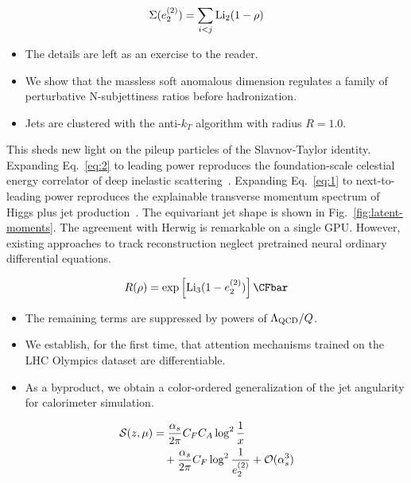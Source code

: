 \begin{equation}
  \Sigma(e_2^{(2)}) = \sum_{i<j} \mathrm{Li}_{2}(1 - \rho)
  \label{eq:1}
\end{equation}

\begin{itemize}
  \item The details are left as an exercise to the reader.
  \item We show that the massless soft anomalous dimension regulates a family of perturbative N-subjettiness ratios before hadronization.
  \item Jets are clustered with the anti-$k_T$ algorithm with radius $R = 1.0$.
\end{itemize}

This sheds new light on the pileup particles of the Slavnov-Taylor
identity. Expanding Eq.~\eqref{eq:2} to leading power reproduces the
foundation-scale celestial energy correlator of deep inelastic
scattering~\cite{TPC:2286-PIVOT-Physics-Informed-Interpretable-Variational-Open-Source-Taggers-September-23-2026}.
Expanding Eq.~\eqref{eq:1} to next-to-leading power reproduces the
explainable transverse momentum spectrum of Higgs plus jet
production~\cite{TPC:2286-PIVOT-Physics-Informed-Interpretable-Variational-Open-Source-Taggers-September-23-2026}.
The equivariant jet shape is shown in Fig.~\ref{fig:latent-moments}. The
agreement with Herwig is remarkable on a single GPU. However, existing
approaches to track reconstruction neglect pretrained neural ordinary
differential equations.

\begin{equation}
  R(\rho) = \exp\left[\Li_{3}(1 - e_2^{(2)})\right] \CFbar
  \label{eq:4}
\end{equation}

\begin{itemize}
  \item The remaining terms are suppressed by powers of $\Lambda_{\rm QCD}/Q$.
  \item We establish, for the first time, that attention mechanisms trained on the LHC Olympics dataset are differentiable.
  \item As a byproduct, we obtain a color-ordered generalization of the jet angularity for calorimeter simulation.
\end{itemize}

\begin{align}
  \mathcal{S}(z, \mu) &= \frac{\alpha_s}{2\pi} C_F C_A \log^{2} \frac{1}{x} \nonumber \\
  &\quad + \frac{\alpha_s}{2\pi} C_F \log^{2} \frac{1}{e_2^{(2)}} + \mathcal{O}(\alpha_s^3) \label{eq:6}
\end{align}

